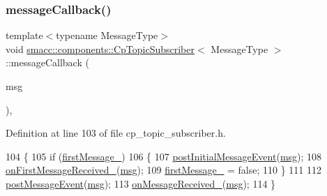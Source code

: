\subsubsection{\texorpdfstring{message\+Callback()}{messageCallback()}}
{\footnotesize\ttfamily template$<$typename Message\+Type$>$ \\
void \hyperlink{classsmacc_1_1components_1_1CpTopicSubscriber}{smacc\+::components\+::\+Cp\+Topic\+Subscriber}$<$ Message\+Type $>$\+::message\+Callback (\begin{DoxyParamCaption}\item[{const Message\+Type \&}]{msg }\end{DoxyParamCaption})\hspace{0.3cm}{\ttfamily [inline]}, {\ttfamily [private]}}



Definition at line 103 of file cp\+\_\+topic\+\_\+subscriber.\+h.


\begin{DoxyCode}
104     \{
105         \textcolor{keywordflow}{if} (\hyperlink{classsmacc_1_1components_1_1CpTopicSubscriber_aadbaf8c0f0a2a5bea38f41356528f41c}{firstMessage\_})
106         \{
107             \hyperlink{classsmacc_1_1components_1_1CpTopicSubscriber_a9e1c210ebc8d5ef0c837e8bd9b83f754}{postInitialMessageEvent}(\hyperlink{namespacebattery__monitor__node_ab1920c64448816edd4064e494275fdff}{msg});
108             \hyperlink{classsmacc_1_1components_1_1CpTopicSubscriber_ab8e319857951489298faefa4882e49cc}{onFirstMessageReceived\_}(\hyperlink{namespacebattery__monitor__node_ab1920c64448816edd4064e494275fdff}{msg});
109             \hyperlink{classsmacc_1_1components_1_1CpTopicSubscriber_aadbaf8c0f0a2a5bea38f41356528f41c}{firstMessage\_} = \textcolor{keyword}{false};
110         \}
111 
112         \hyperlink{classsmacc_1_1components_1_1CpTopicSubscriber_a002ca59f74f784f14597d1c0e057d298}{postMessageEvent}(\hyperlink{namespacebattery__monitor__node_ab1920c64448816edd4064e494275fdff}{msg});
113         \hyperlink{classsmacc_1_1components_1_1CpTopicSubscriber_aeec04e64cad880bd49d401c2a474c6e9}{onMessageReceived\_}(\hyperlink{namespacebattery__monitor__node_ab1920c64448816edd4064e494275fdff}{msg});
114     \}
\end{DoxyCode}
\mbox{\label{classsmacc_1_1components_1_1CpTopicSubscriber_ac7b226871cec5c4358cc635e02f56bf2}} 
